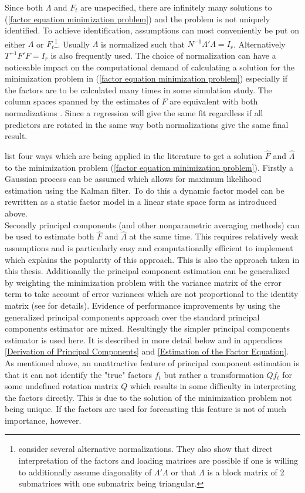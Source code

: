 \documentclass[12pt]{article}
\begin{document}
Since both $\Lambda$ and $F_t$ are unspecified, there are infinitely many solutions to (\ref{factor equation minimization problem}) and the problem is not uniquely identified. To achieve identification, assumptions can most conveniently be put on either $\Lambda$ or $F_t$\footnote{\citet{bai2013principal} consider several alternative normalizations. They also show that direct interpretation of the factors and loading matrices are possible if one is willing to additionally assume diagonality of $\Lambda'\Lambda$ or that $\Lambda$ is a block matrix of 2 submatrices with one submatrix being triangular.}. Usually $\Lambda$ is normalized such that $N^{-1} \Lambda'\Lambda = I_r$. Alternatively $T^{-1}F'F = I_r$ is also frequently used. The choice of normalization can have a noticeable impact on the computational demand of calculating a solution for the minimization problem in (\ref{factor equation minimization problem}) especially if the factors are to be calculated many times in some simulation study. The column spaces spanned by the estimates of $F$ are equivalent with both normalizations \citep{stock2011dynamic}. Since a regression will give the same fit regardless if all predictors are rotated in the same way both normalizations give the same final result.

\citet{stock2011dynamic} list four ways which are being applied in the literature to get a solution $\hat F$ and $\hat \Lambda$ to the minimization problem (\ref{factor equation minimization problem}). Firstly a Gaussian process can be assumed which allows for maximum likelihood estimation using the Kalman filter. To do this a dynamic factor model can be rewritten as a static factor model in a linear state space form as introduced above. \\
Secondly principal components (and other nonparametric averaging methods) can be used to estimate both $\hat F$ and $\hat \Lambda$ at the same time. This requires relatively weak assumptions and is particularly easy and computationally efficient to implement which explains the popularity of this approach. This is also the approach taken in this thesis. Additionally the principal component estimation can be generalized by weighting the minimization problem with the variance matrix of the error term to take account of error variances which are not proportional to the identity matrix (see \citet{stock2011dynamic} for details). Evidence of performance improvements by using the generalized principal components approach over the standard principal components estimator are mixed. Resultingly the simpler principal components estimator is used here. It is described in more detail below and in appendices \ref{Derivation of Principal Components} and \ref{Estimation of the Factor Equation}. As mentioned above, an unattractive feature of principal component estimation is that it can not identify the "true" factors $f_t$ but rather a transformation $Q f_t$ for some undefined rotation matrix $Q$ which results in some difficulty in interpreting the factors directly. This is due to the solution of the minimization problem not being unique. If the factors are used for forecasting this feature is not of much importance, however.
\end{document}
